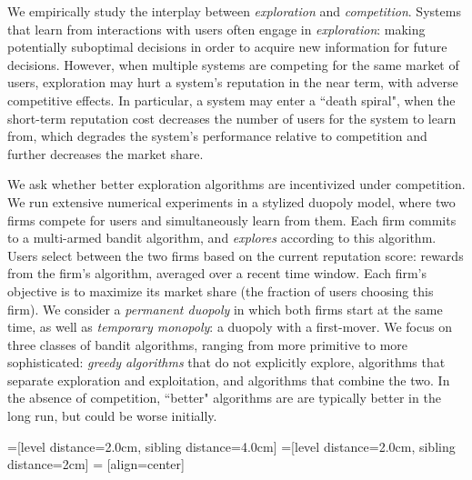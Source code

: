 \documentclass[acmsmall]{ec19acm}
\theoremstyle{definition}
\begin{document}
We empirically study the interplay between \textit{exploration} and
  \textit{competition}. Systems that learn from interactions with
  users often engage in \emph{exploration}: making potentially
  suboptimal decisions in order to acquire new information for future
  decisions. However, when multiple systems are competing for
    the same market of users, exploration may hurt a system's
    reputation in the near term, with adverse competitive effects. In particular, a system may enter a ``death spiral", when the short-term reputation cost decreases
    the number of users for the system to learn from, which degrades the
    system's performance relative to competition and further decreases
    the market share.

We ask whether better exploration algorithms are incentivized under competition.  We run extensive numerical experiments in a stylized duopoly model, where two firms compete for users and simultaneously learn from them. Each firm commits to a multi-armed bandit algorithm, and \emph{explores} according to this algorithm. Users select between the two firms based on the current reputation score: rewards from the firm's algorithm, averaged over a recent time window. Each firm's objective is to maximize its market share (the fraction of users choosing this firm). We consider a \emph{permanent duopoly} in which both firms start at the same time, as well as \emph{temporary monopoly}: a duopoly with a first-mover. We focus on three classes of bandit algorithms, ranging from more primitive to more sophisticated: \emph{greedy algorithms} that do not explicitly explore, algorithms that separate exploration and exploitation, and algorithms that combine the two. In the absence of competition,  ``better" algorithms are are typically better in the long run, but could be worse initially.


=[level distance=2.0cm, sibling distance=4.0cm]
=[level distance=2.0cm, sibling distance=2cm]
 = [align=center]
\end{document}
